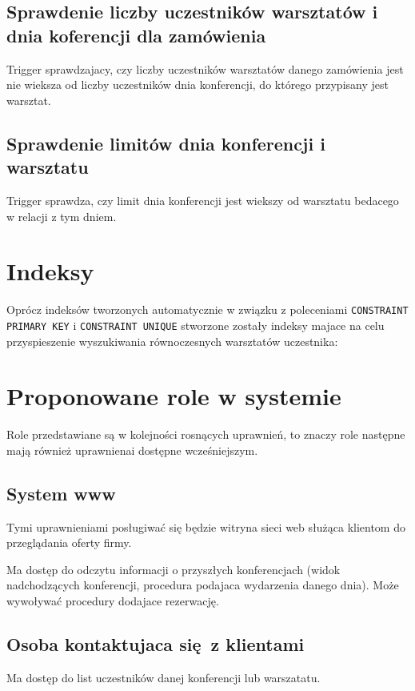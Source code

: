 \documentclass[12pt]{article}
\begin{document}
\subsection{Sprawdenie liczby uczestników warsztatów i dnia koferencji dla zamówienia}
Trigger sprawdzajacy, czy liczby uczestników warsztatów danego zamówienia jest nie wieksza od liczby uczestników dnia konferencji, do którego przypisany jest warsztat.


\subsection{Sprawdenie limitów dnia konferencji i warsztatu}
Trigger sprawdza, czy limit dnia konferencji jest wiekszy od warsztatu bedacego w relacji z tym dniem.


\section{Indeksy}
Oprócz indeksów tworzonych automatycznie w związku z poleceniami \texttt{CONSTRAINT PRIMARY KEY} i \texttt{CONSTRAINT UNIQUE} stworzone zostały indeksy majace na celu przyspieszenie wyszukiwania równoczesnych warsztatów uczestnika:



\section{Proponowane role w systemie}
Role przedstawiane są w kolejności rosnących uprawnień, to znaczy role następne mają również uprawnienai dostępne wcześniejszym.

\subsection{System www}
Tymi uprawnieniami posługiwać się będzie witryna sieci web służąca klientom do przeglądania oferty firmy.

Ma dostęp do odczytu informacji o przyszłych konferencjach (widok nadchodzących konferencji, procedura podajaca wydarzenia danego dnia). Może wywoływać procedury dodajace rezerwację.

\subsection{Osoba kontaktujaca się z klientami}
Ma dostęp do list uczestników danej konferencji lub warszatatu. 
\end{document}
